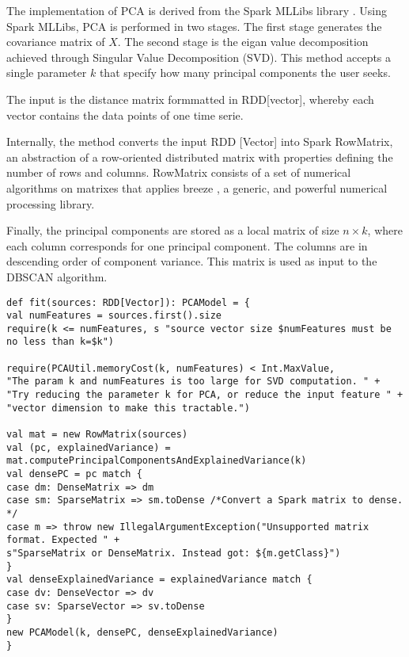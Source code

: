 The implementation of PCA is derived from the Spark MLLibs library \cite{meng2016mllib}. Using Spark MLLibs, PCA is performed in two stages. The first stage generates the  covariance matrix of $X$. The second stage is the eigan value decomposition achieved through Singular Value Decomposition (SVD). This method accepts a single parameter $k$ that specify how many principal components the user seeks. 

The input is the distance matrix formmatted in \textsf{RDD[vector]}, whereby each vector contains the data points of one time serie.

Internally, the method converts the input \textsf{RDD [Vector]} into Spark \textsf{RowMatrix}, an abstraction of a row-oriented distributed matrix with properties defining the number of rows and columns. \textsf{RowMatrix} consists of a set of numerical algorithms on matrixes that applies breeze \cite{breeze}, a generic, and powerful numerical processing library. 
%


Finally, the principal components are stored as a local matrix of size $ n\times k$, where each column corresponds for one principal component. The columns are in descending order of component variance. This matrix is used as input to the DBSCAN algorithm. 

\begin{lstlisting}[style=myScalastyle,caption={ PCA Spark Implementation},captionpos=b]
def fit(sources: RDD[Vector]): PCAModel = {
val numFeatures = sources.first().size
require(k <= numFeatures, s "source vector size $numFeatures must be no less than k=$k")

require(PCAUtil.memoryCost(k, numFeatures) < Int.MaxValue,
"The param k and numFeatures is too large for SVD computation. " +
"Try reducing the parameter k for PCA, or reduce the input feature " +
"vector dimension to make this tractable.")

val mat = new RowMatrix(sources)
val (pc, explainedVariance) = mat.computePrincipalComponentsAndExplainedVariance(k)
val densePC = pc match {
case dm: DenseMatrix => dm
case sm: SparseMatrix => sm.toDense /*Convert a Spark matrix to dense. */
case m => throw new IllegalArgumentException("Unsupported matrix format. Expected " +
s"SparseMatrix or DenseMatrix. Instead got: ${m.getClass}")
}
val denseExplainedVariance = explainedVariance match {
case dv: DenseVector => dv
case sv: SparseVector => sv.toDense
}
new PCAModel(k, densePC, denseExplainedVariance)
}
\end{lstlisting}


